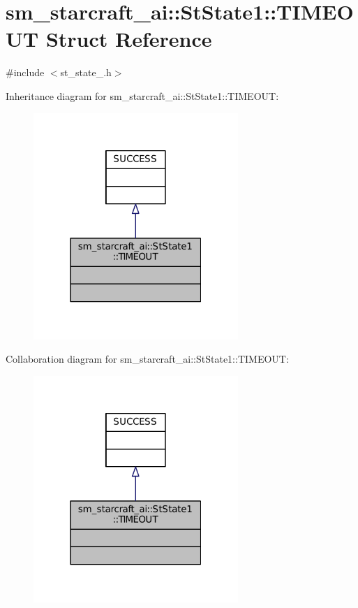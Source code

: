 \hypertarget{structsm__starcraft__ai_1_1StState1_1_1TIMEOUT}{}\section{sm\+\_\+starcraft\+\_\+ai\+:\+:St\+State1\+:\+:T\+I\+M\+E\+O\+UT Struct Reference}
\label{structsm__starcraft__ai_1_1StState1_1_1TIMEOUT}


{\ttfamily \#include $<$st\+\_\+state\+\_.\+h$>$}



Inheritance diagram for sm\+\_\+starcraft\+\_\+ai\+:\+:St\+State1\+:\+:T\+I\+M\+E\+O\+UT\+:
\nopagebreak
\begin{figure}[H]
\begin{center}
\leavevmode
\includegraphics[width=220pt]{structsm__starcraft__ai_1_1StState1_1_1TIMEOUT__inherit__graph}
\end{center}
\end{figure}


Collaboration diagram for sm\+\_\+starcraft\+\_\+ai\+:\+:St\+State1\+:\+:T\+I\+M\+E\+O\+UT\+:
\nopagebreak
\begin{figure}[H]
\begin{center}
\leavevmode
\includegraphics[width=220pt]{structsm__starcraft__ai_1_1StState1_1_1TIMEOUT__coll__graph}
\end{center}
\end{figure}


